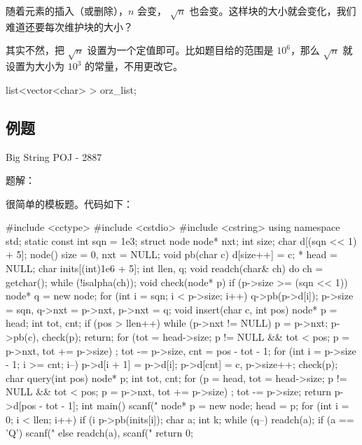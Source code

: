 随着元素的插入（或删除），$n$ 会变， $\sqrt{n}$ 也会变。这样块的大小就会变化，我们难道还要每次维护块的大小？

其实不然，把 $\sqrt{n}$ 设置为一个定值即可。比如题目给的范围是 $10^6$，那么 $\sqrt{n}$ 就设置为大小为 $10^3$ 的常量，不用更改它。

\begin{cppcode}
list<vector<char> > orz_list;
\end{cppcode}

\subsection{例题}

Big String POJ - 2887

题解：

很简单的模板题。代码如下：

\begin{cppcode}
#include <cctype>
#include <cstdio>
#include <cstring>
using namespace std;
static const int sqn = 1e3;
struct node {
  node* nxt;
  int size;
  char d[(sqn << 1) + 5];
  node() { size = 0, nxt = NULL; }
  void pb(char c) { d[size++] = c; }
}* head = NULL;
char inits[(int)1e6 + 5];
int llen, q;
void readch(char& ch) {
  do
    ch = getchar();
  while (!isalpha(ch));
}
void check(node* p) {
  if (p->size >= (sqn << 1)) {
    node* q = new node;
    for (int i = sqn; i < p->size; i++) q->pb(p->d[i]);
    p->size = sqn, q->nxt = p->nxt, p->nxt = q;
  }
}
void insert(char c, int pos) {
  node* p = head;
  int tot, cnt;
  if (pos > llen++) {
    while (p->nxt != NULL) p = p->nxt;
    p->pb(c), check(p);
    return;
  }
  for (tot = head->size; p != NULL && tot < pos; p = p->nxt, tot += p->size)
    ;
  tot -= p->size, cnt = pos - tot - 1;
  for (int i = p->size - 1; i >= cnt; i--) p->d[i + 1] = p->d[i];
  p->d[cnt] = c, p->size++;
  check(p);
}
char query(int pos) {
  node* p;
  int tot, cnt;
  for (p = head, tot = head->size; p != NULL && tot < pos;
       p = p->nxt, tot += p->size)
    ;
  tot -= p->size;
  return p->d[pos - tot - 1];
}
int main() {
  scanf("%
  node* p = new node;
  head = p;
  for (int i = 0; i < llen; i++) {
    if (i %
    p->pb(inits[i]);
  }
  char a;
  int k;
  while (q--) {
    readch(a);
    if (a == 'Q')
      scanf("%
    else
      readch(a), scanf("%
  }
  return 0;
}
\end{cppcode}

